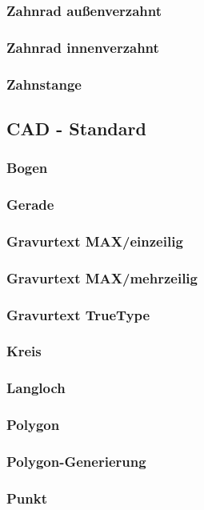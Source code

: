 \documentclass[a4paper]{book}
\begin{document}
			\subsubsection{Zahnrad außenverzahnt}
			\subsubsection{Zahnrad innenverzahnt}
			\subsubsection{Zahnstange}
		\subsection{CAD - Standard}
			\subsubsection{Bogen} 
			\subsubsection{Gerade}
			\subsubsection{Gravurtext MAX/einzeilig} 
			\subsubsection{Gravurtext MAX/mehrzeilig}
			\subsubsection{Gravurtext TrueType} 
			\subsubsection{Kreis} 
			\subsubsection{Langloch} 
			\subsubsection{Polygon} 
			\subsubsection{Polygon-Generierung} 
			\subsubsection{Punkt} 
\end{document}
